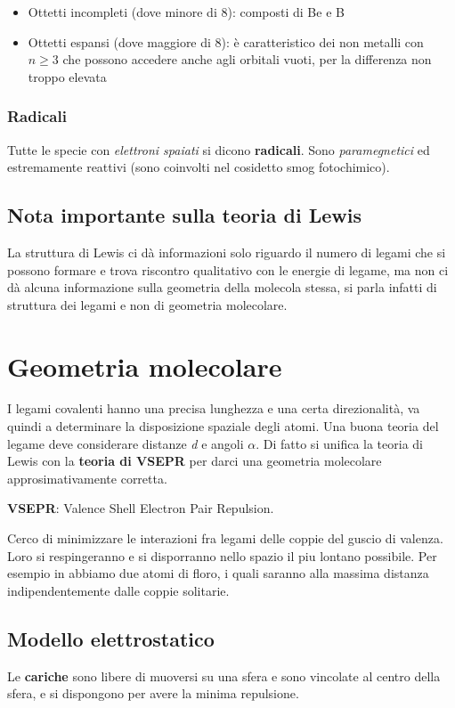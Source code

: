 \begin{itemize}
    \item Ottetti incompleti (dove minore di 8): composti di Be e B
    \item Ottetti espansi (dove maggiore di 8): è caratteristico dei non metalli con $n\ge 3$ che possono accedere anche agli orbitali vuoti, per la differenza non troppo elevata
\end{itemize}

\subsubsection{Radicali}
Tutte le specie con \emph{elettroni spaiati} si dicono \textbf{radicali}. Sono \emph{paramegnetici} ed estremamente reattivi (sono coinvolti nel cosidetto smog fotochimico). 

\subsection{Nota importante sulla teoria di Lewis}
La struttura di Lewis ci dà informazioni solo riguardo il numero di legami che si possono formare e trova riscontro qualitativo con le energie di legame, ma non ci dà alcuna informazione sulla geometria della molecola stessa, si parla infatti di struttura dei legami e non di geometria molecolare. 

\section{Geometria molecolare}
I legami covalenti hanno una precisa lunghezza e una certa direzionalità, va quindi a determinare la disposizione spaziale degli atomi. Una buona teoria del legame deve considerare distanze \emph{d} e angoli \emph{$\alpha$}. Di fatto si unifica la teoria di Lewis con la \textbf{teoria di VSEPR} per darci una geometria molecolare approsimativamente corretta. 

\textbf{VSEPR}: Valence Shell Electron Pair Repulsion.  

Cerco di minimizzare le interazioni fra legami delle coppie del guscio di valenza. Loro si respingeranno e si disporranno nello spazio il piu lontano possibile. Per esempio in  abbiamo due atomi di floro, i quali saranno alla massima distanza indipendentemente dalle coppie solitarie. 

\subsection{Modello elettrostatico}
Le \textbf{cariche} sono libere di muoversi su una sfera e sono vincolate al centro della sfera, e si dispongono per avere la minima repulsione. 

